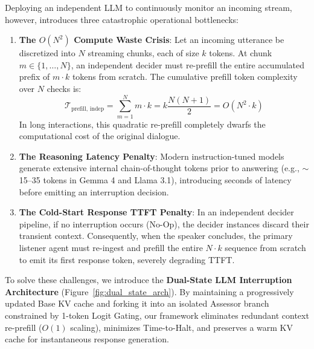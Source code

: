 \documentclass{article}
\begin{document}
Deploying an independent LLM to continuously monitor an incoming stream, however, introduces three catastrophic operational bottlenecks:
\begin{enumerate}
    \item \textbf{The $O(N^2)$ Compute Waste Crisis}: Let an incoming utterance be discretized into $N$ streaming chunks, each of size $k$ tokens. At chunk $m \in \{1, \dots, N\}$, an independent decider must re-prefill the entire accumulated prefix of $m \cdot k$ tokens from scratch. The cumulative prefill token complexity over $N$ checks is:
    \begin{equation}
    \mathcal{T}_{\text{prefill, indep}} = \sum_{m=1}^N m \cdot k = k \frac{N(N+1)}{2} = O(N^2 \cdot k)
    \end{equation}
    In long interactions, this quadratic re-prefill completely dwarfs the computational cost of the original dialogue.
    \item \textbf{The Reasoning Latency Penalty}: Modern instruction-tuned models generate extensive internal chain-of-thought tokens prior to answering (e.g., $\sim$15--35 tokens in Gemma 4 and Llama 3.1), introducing seconds of latency before emitting an interruption decision.
    \item \textbf{The Cold-Start Response TTFT Penalty}: In an independent decider pipeline, if no interruption occurs (No-Op), the decider instances discard their transient context. Consequently, when the speaker concludes, the primary listener agent must re-ingest and prefill the entire $N \cdot k$ sequence from scratch to emit its first response token, severely degrading TTFT.
\end{enumerate}

To solve these challenges, we introduce the \textbf{Dual-State LLM Interruption Architecture} (Figure~\ref{fig:dual_state_arch}). By maintaining a progressively updated Base KV cache and forking it into an isolated Assessor branch constrained by 1-token Logit Gating, our framework eliminates redundant context re-prefill ($O(1)$ scaling), minimizes Time-to-Halt, and preserves a warm KV cache for instantaneous response generation.
\end{document}
